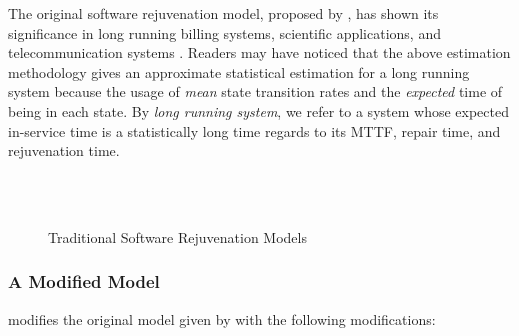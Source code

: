 The original software rejuvenation model, proposed by 
\citet{huang1995software}, has shown its significance in long running billing 
systems, scientific applications, and telecommunication systems 
\citep{huang1995software}. Readers may have noticed that the above estimation 
methodology gives an approximate statistical estimation for a long running 
system because the usage of {\it mean} state transition rates and the {\it 
expected} time of being in each state.  By {\it long running system}, we refer 
to a system whose expected in-service time is a statistically long time regards 
to its MTTF, repair time, and rejuvenation time.


\begin{figure}
  \centering         
        \\
        \\
    \caption{Traditional Software Rejuvenation Models}
   \label{fig:model_traditional}
\end{figure}

\subsubsection{A Modified Model}

\citet{dohi2000statistical} modifies the original model given 
by \citet{huang1995software} with the following modifications:

